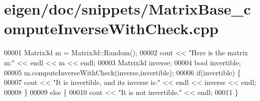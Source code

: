 \hypertarget{eigen_2doc_2snippets_2_matrix_base__compute_inverse_with_check_8cpp_source}{}\section{eigen/doc/snippets/\+Matrix\+Base\+\_\+compute\+Inverse\+With\+Check.cpp}
\label{eigen_2doc_2snippets_2_matrix_base__compute_inverse_with_check_8cpp_source}

\begin{DoxyCode}
00001 Matrix3d m = Matrix3d::Random();
00002 cout << \textcolor{stringliteral}{"Here is the matrix m:"} << endl << m << endl;
00003 Matrix3d inverse;
00004 \textcolor{keywordtype}{bool} invertible;
00005 m.computeInverseWithCheck(inverse,invertible);
00006 \textcolor{keywordflow}{if}(invertible) \{
00007   cout << \textcolor{stringliteral}{"It is invertible, and its inverse is:"} << endl << inverse << endl;
00008 \}
00009 \textcolor{keywordflow}{else} \{
00010   cout << \textcolor{stringliteral}{"It is not invertible."} << endl;
00011 \}
\end{DoxyCode}
